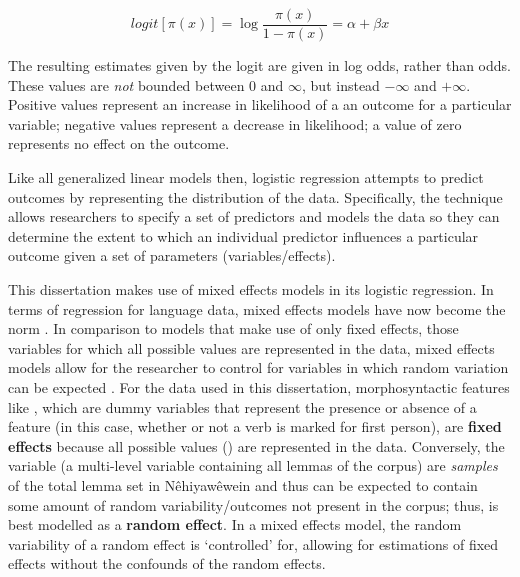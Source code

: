 \begin{equation}
logit[\pi(x)] = \log \frac{\pi(x)}{1-\pi(x)} = \alpha + \beta x
\label{logit}
\end{equation}

The resulting estimates given by the logit are given in log odds, rather than odds. These values are \textit{not} bounded between 0 and $\infty$, but instead $-\infty$ and $+\infty$. Positive values represent an increase in likelihood of a an outcome for a particular variable; negative values represent a decrease in likelihood; a value of zero represents no effect on the outcome.

Like all generalized linear models then, logistic regression attempts to predict outcomes by representing the distribution of the data. Specifically, the technique allows researchers to specify a set of predictors and models the data so they can determine the extent to which an individual predictor influences a particular outcome given a set of parameters (variables/effects).

This dissertation makes use of mixed effects models in its logistic regression. In terms of regression for language data, mixed effects models have now become the norm \citep[100]{barth2018evaluating}. In comparison to models that make use of only fixed effects, those variables for which all possible values are represented in the data, mixed effects models allow for the researcher to control for variables in which random variation can be expected \citep{baayen2012mixed}. For the data used in this dissertation, morphosyntactic features like , which are dummy variables that represent the presence or absence of a feature (in this case, whether or not a verb is marked for first person), are \textbf{fixed effects} because all possible values () are represented in the data. Conversely, the  variable (a multi-level variable containing all lemmas of the corpus) are \textit{samples} of the total lemma set in Nêhiyawêwein and thus can be expected to contain some amount of random variability/outcomes not present in the corpus; thus,  is best modelled as a \textbf{random effect}. In a mixed effects model, the random variability of a random effect is `controlled' for, allowing for estimations of fixed effects without the confounds of the random effects. 


